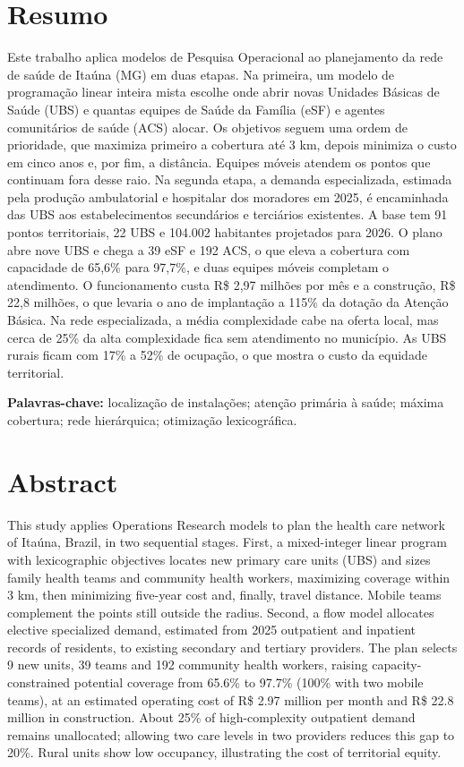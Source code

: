 \documentclass[12pt,a4paper,oneside]{report}
\begin{document}
\chapter*{Resumo}
Este trabalho aplica modelos de Pesquisa Operacional ao planejamento da rede de saúde de Itaúna (MG) em
duas etapas. Na primeira, um modelo de programação linear inteira mista escolhe onde abrir novas Unidades
Básicas de Saúde (UBS) e quantas equipes de Saúde da Família (eSF) e agentes comunitários de saúde (ACS)
alocar. Os objetivos seguem uma ordem de prioridade, que maximiza primeiro a cobertura até 3 km, depois
minimiza o custo em cinco anos e, por fim, a distância. Equipes móveis atendem os pontos que continuam
fora desse raio. Na segunda etapa, a demanda especializada, estimada pela produção ambulatorial e
hospitalar dos moradores em 2025, é encaminhada das UBS aos estabelecimentos secundários e terciários
existentes. A base tem 91 pontos territoriais, 22 UBS e 104.002 habitantes projetados para 2026. O plano
abre nove UBS e chega a 39 eSF e 192 ACS, o que eleva a cobertura com capacidade de 65,6\% para 97,7\%, e
duas equipes móveis completam o atendimento. O funcionamento custa R\$ 2,97 milhões por mês e a
construção, R\$ 22,8 milhões, o que levaria o ano de implantação a 115\% da dotação da Atenção Básica. Na
rede especializada, a média complexidade cabe na oferta local, mas cerca de 25\% da alta complexidade
fica sem atendimento no município. As UBS rurais ficam com 17\% a 52\% de ocupação, o que mostra o custo
da equidade territorial.

\noindent\textbf{Palavras-chave:} localização de instalações; atenção primária à saúde; máxima cobertura;
rede hierárquica; otimização lexicográfica.

\chapter*{Abstract}
This study applies Operations Research models to plan the health care network of Itaúna, Brazil, in two
sequential stages. First, a mixed-integer linear program with lexicographic objectives locates new
primary care units (UBS) and sizes family health teams and community health workers, maximizing
coverage within 3 km, then minimizing five-year cost and, finally, travel distance. Mobile teams
complement the points still outside the radius. Second, a flow model allocates elective specialized
demand, estimated from 2025 outpatient and inpatient records of residents, to existing secondary and
tertiary providers. The plan selects 9 new units, 39 teams and 192 community health workers, raising
capacity-constrained potential coverage from 65.6\% to 97.7\% (100\% with two mobile teams), at an
estimated operating cost of R\$ 2.97 million per month and R\$ 22.8 million in construction. About 25\% of
high-complexity outpatient demand remains unallocated; allowing two care levels in two providers
reduces this gap to 20\%. Rural units show low occupancy, illustrating the cost of territorial equity.
\end{document}
